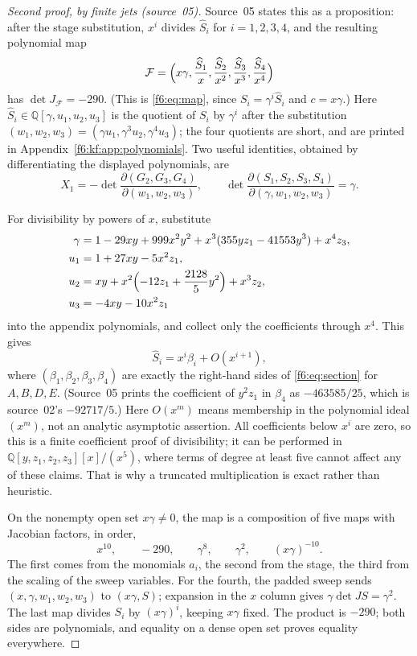 \documentclass[11pt,a4paper]{article}
\theoremstyle{definition}
\newcommand{\Q}{\mathbb Q}
\newcommand{\F}{\mathcal F}
\newcommand{\src}[1]{\textup{(source~#1)}}
\begin{document}
\begin{proof}[Second proof, by finite jets \src{05}]
\label{f6:kf:prop:polynomial}
Source~05 states this as a proposition: after the stage substitution, $x^i$
divides $\widehat S_i$ for $i=1,2,3,4$, and the resulting polynomial map
\[
 \F=\Bigl(x\gamma,\frac{\widehat S_1}{x},\frac{\widehat S_2}{x^2},
 \frac{\widehat S_3}{x^3},\frac{\widehat S_4}{x^4}\Bigr)
\]
has $\det J_\F=-290$. (This is \eqref{f6:eq:map}, since $S_i=\gamma^i\widehat
S_i$ and $c=x\gamma$.) Here $\widehat S_i\in\Q[\gamma,u_1,u_2,u_3]$ is the
quotient of $S_i$ by $\gamma^i$ after the substitution
$(w_1,w_2,w_3)=(\gamma u_1,\gamma^3u_2,\gamma^4u_3)$; the four quotients are
short, and are printed in Appendix~\ref{f6:kf:app:polynomials}. Two useful
identities, obtained by differentiating the displayed polynomials, are
\begin{equation}\label{f6:kf:eq:sweepdet}
 X_1=-\det\frac{\partial(G_2,G_3,G_4)}{\partial(w_1,w_2,w_3)},
 \qquad
 \det\frac{\partial(S_1,S_2,S_3,S_4)}{\partial(\gamma,w_1,w_2,w_3)}=\gamma .
\end{equation}

For divisibility by powers of $x$, substitute
\begin{align*}
\gamma&=1-29xy+999x^2y^2+x^3(355yz_1-41553y^3)+x^4z_3,\\
u_1&=1+27xy-5x^2z_1,\\
u_2&=xy+x^2\Bigl(-12z_1+\frac{2128}{5}y^2\Bigr)+x^3z_2,\\
u_3&=-4xy-10x^2z_1
\end{align*}
into the appendix polynomials, and collect only the coefficients through
$x^4$. This gives
\begin{equation}\label{f6:kf:eq:jets}
 \widehat S_i=x^i\beta_i+O(x^{i+1}),
\end{equation}
where $(\beta_1,\beta_2,\beta_3,\beta_4)$ are exactly the right-hand sides of
\eqref{f6:eq:section} for $A,B,D,E$. (Source~05 prints the coefficient of
$y^2z_1$ in $\beta_4$ as $-463585/25$, which is source~02's $-92717/5$.) Here
$O(x^m)$ means membership in the polynomial ideal $(x^m)$, not an analytic
asymptotic assertion. All coefficients below $x^i$ are zero, so this is a
finite coefficient proof of divisibility; it can be performed in
$\Q[y,z_1,z_2,z_3][x]/(x^5)$, where terms of degree at least five cannot
affect any of these claims. That is why a truncated multiplication is exact
rather than heuristic.

On the nonempty open set $x\gamma\ne0$, the map is a composition of five
maps with Jacobian factors, in order,
\[
 x^{10},\qquad -290,\qquad \gamma^8,\qquad\gamma^2,\qquad (x\gamma)^{-10}.
\]
The first comes from the monomials $a_i$, the second from the stage, the third
from the scaling of the sweep variables. For the fourth, the padded sweep
sends $(x,\gamma,w_1,w_2,w_3)$ to $(x\gamma,S)$; expansion in the $x$ column
gives $\gamma\det J S=\gamma^2$. The last map divides $S_i$ by
$(x\gamma)^i$, keeping $x\gamma$ fixed. The product is $-290$; both sides
are polynomials, and equality on a dense open set proves equality
everywhere.
\end{proof}
\end{document}
